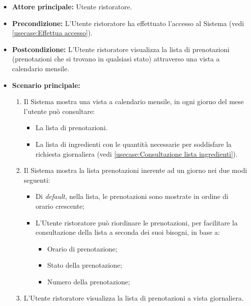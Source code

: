 \begin{itemize}
	\item \textbf{Attore principale:} Utente ristoratore.

	\item \textbf{Precondizione:} L'Utente ristoratore ha effettuato l'accesso al Sistema (vedi \autoref{usecase:Effettua accesso}).

	\item \textbf{Postcondizione:} L'Utente ristoratore visualizza la lista di
		prenotazioni (prenotazioni che si trovano in qualsiasi stato) attraverso
		una vista a calendario mensile.

	\item \textbf{Scenario principale:}
	      \begin{enumerate}
		      \item Il Sistema mostra una vista a calendario mensile, in ogni
				  giorno del mese l'utente può consultare:
		            \begin{itemize}
			            \item La lista di prenotazioni.
			            \item La lista di ingredienti con le quantità necessarie 
							per soddisfare la richiesta giornaliera 
							(vedi \autoref{usecase:Consultazione lista ingredienti}).
		            \end{itemize}

		      \item Il Sistema mostra la lista prenotazioni inerente ad un 
				  giorno nei due modi seguenti:
		            \begin{itemize}
			            \item Di \textit{default}, nella lista, le prenotazioni 
							sono mostrate in ordine di orario crescente;

			            \item L'Utente ristoratore può riordinare le 
							prenotazioni, per facilitare la consultazione della 
							lista a seconda dei suoi bisogni, in base a:
							\begin{itemize}
								\item Orario di prenotazione;
								\item Stato della prenotazione;
								\item Numero della prenotazione;
							\end{itemize}
		            \end{itemize}

		      \item L'Utente ristoratore visualizza la lista di prenotazioni a
				  vista giornaliera.
	      \end{enumerate}
\end{itemize}


